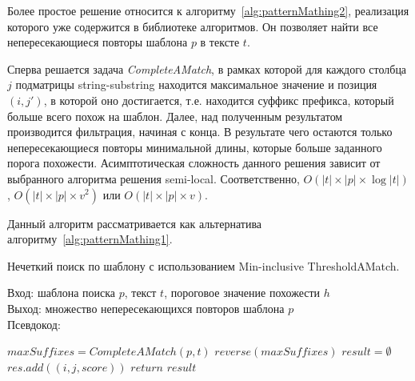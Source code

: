 Более простое решение относится к алгоритму~\ref{alg:patternMathing2}, реализация которого уже содержится в библиотеке алгоритмов. 
Он позволяет найти все непересекающиеся повторы шаблона $p$ в тексте $t$.

Сперва решается задача \emph{CompleteAMatch}, в рамках которой для каждого столбца $j$ подматрицы {string-substring} находится максимальное значение и позиция $(i,j')$, в которой оно  достигается, т.е. находится суффикс префикса, который больше всего похож на шаблон.
Далее, над полученным результатом производится фильтрация, начиная с конца.
В результате чего остаются только непересекающиеся повторы минимальной длины, которые больше заданного порога похожести.
Асимптотическая сложность данного решения зависит от выбранного алгоритма  решения {semi-local}.
Соответственно, $O(|t| \times |p| \times \log |t|)$, $O(|t| \times |p| \times v^2)$ или $O(|t| \times |p| \times v)$.

Данный алгоритм рассматривается как альтернатива алгоритму~\ref{alg:patternMathing1}.

\begin{algorithm}[b!]
\caption{Нечеткий поиск по шаблону с использованием Min-inclusive ThresholdAMatch.}\label{alg:patternMathing2}
Вход: шаблона поиска $p$, текст $t$, пороговое значение похожести $h$\\
Выход: множество непересекающихся повторов шаблона $p$\\
Псевдокод:
\begin{algorithmic}[1]
\State $maxSuffixes= CompleteAMatch(p,t)$
\State $reverse(maxSuffixes)$
\State $result = \emptyset$
    \State $res.add((i,j,score))$ 
    \EndIf
\EndFor
\State $return$ $result$

\end{algorithmic}
\end{algorithm}


